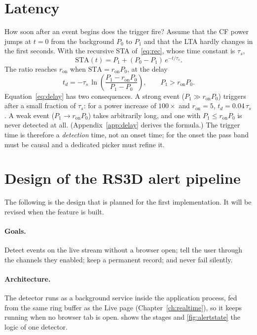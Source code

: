 \section{Latency}\label{sec:latency}
How soon after an event begins does the trigger fire? Assume that the CF power jumps at $t=0$ from the background $P_0$ to
$P_1$ and that the LTA hardly changes in the first seconds. With the recursive STA of~\eqref{eq:rec}, whose time constant is
$\tau_s$,
\begin{equation}
  \mathrm{STA}(t) = P_1 + (P_0-P_1)\,e^{-t/\tau_s}.
\end{equation}
The ratio reaches $r_{\mathrm{on}}$ when $\mathrm{STA}=r_{\mathrm{on}}P_0$, at the delay
\begin{equation}\label{eq:delay}
  t_d = -\tau_s\,\ln\!\left(\frac{P_1-r_{\mathrm{on}}P_0}{P_1-P_0}\right),\qquad P_1>r_{\mathrm{on}}P_0 .
\end{equation}
Equation~\eqref{eq:delay} has two consequences. A strong event ($P_1\gg r_{\mathrm{on}}P_0$) triggers after a small fraction
of $\tau_s$: for a power increase of $100\times$ and $r_{\mathrm{on}}=5$, $t_d=0.04\,\tau_s$. A weak event
($P_1\to r_{\mathrm{on}}P_0$) takes arbitrarily long, and one with $P_1\le r_{\mathrm{on}}P_0$ is never detected at all.
(Appendix~\ref{app:delay} derives the formula.) The trigger time is therefore a \emph{detection} time, not an onset
time; for the onset the pass band must be causal and a dedicated picker must refine it.

\section{Design of the RS3D alert pipeline}\label{sec:alertdesign}
\begin{rs3dwarn}
The following is the design that is planned for the first implementation. It will be revised when the feature is built.
\end{rs3dwarn}

\paragraph{Goals.} Detect events on the live stream without a browser open; tell the user through the channels they
enabled; keep a permanent record; and never fail silently.

\paragraph{Architecture.} The detector runs as a background service inside the application process, fed from the same
ring buffer as the Live page (Chapter~\ref{ch:realtime}), so it keeps running when no browser tab is open.
 shows the stages and \cref{fig:alertstate} the logic of one detector.

